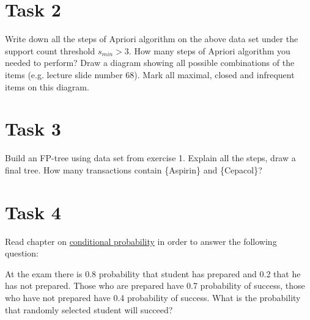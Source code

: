 \documentclass{article}
\begin{document}
\section*{Task 2}
Write down all the steps of Apriori algorithm on the above data set under the support count  threshold $s_{min} > 3$. How many steps of Apriori algorithm you needed to perform? Draw a diagram showing all possible combinations of the items (e.g. lecture slide number 68). Mark all maximal, closed and infrequent items on this diagram.

\section*{Task 3}
Build an FP-tree  using data set from exercise 1. Explain all the steps, draw a final tree. How many transactions contain \{Aspirin\} and \{Cepacol\}?

\section*{Task 4}
Read chapter on \href{http://mathwiki.cs.ut.ee/probability/02_multiple_event_probability}{conditional probability} in order to answer the following question:
\begin{framed}
At the exam there is 0.8 probability that student has prepared and 0.2 that he has not prepared. Those who are prepared have 0.7 probability of success, those who have not prepared have 0.4 probability of success. What is the probability that randomly selected student will succeed?
\end{framed}
\end{document}
